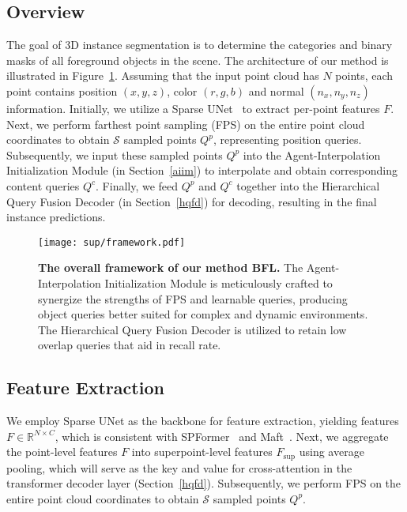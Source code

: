 \subsection{Overview}
\label{overview}
The goal of 3D instance segmentation is to determine the categories and binary masks of all foreground objects in the scene. 
%
The architecture of our method is illustrated in Figure~\ref{framework}.
%
Assuming that the input point cloud
has $N$ points, each point contains position $(x, y, z)$, color
$(r, g, b)$ and normal $(n_x, n_y, n_z)$ information.
Initially, we utilize a Sparse UNet~\cite{spconv2022} to extract per-point features $F$. Next, we perform farthest point sampling (FPS) on the entire point cloud coordinates to obtain $\mathcal{S}$ sampled points $Q^p$, representing position queries. Subsequently, we input these sampled points $Q^p$ into the Agent-Interpolation Initialization Module (in Section~\ref{aiim}) to interpolate and obtain corresponding content queries $Q^c$. Finally, we feed $Q^p$ and $Q^c$ together into the Hierarchical Query Fusion Decoder (in Section~\ref{hqfd}) for decoding, resulting in the final instance predictions.


\begin{figure}[!t]
    \vspace{-2em}
    \begin{center}
        \texttt{[image: sup/framework.pdf]}
        \caption{\textbf{The overall framework of our method BFL.} The Agent-Interpolation Initialization Module is meticulously crafted to synergize the strengths of FPS and learnable queries, producing object queries better suited for complex and dynamic environments. The Hierarchical Query Fusion Decoder is utilized to retain low overlap queries that aid in recall rate.\vspace{-1.0em}
        }
        \label{framework}
    \end{center}
    \vspace{-1.em}
\end{figure}
\subsection{Feature Extraction}
We employ Sparse UNet as the backbone for feature extraction, yielding features $F \in \mathbb{R} ^{N\times C}$, which is consistent with SPFormer~\cite{sun2023superpoint} and Maft~\cite{lai2023mask}. Next, we aggregate the point-level features $F$ into superpoint-level features $F_{\text{sup}}$ using average pooling, which will serve as the key and value for cross-attention in the transformer decoder layer (Section~\ref{hqfd}). Subsequently, we perform FPS on the entire point cloud coordinates to obtain $\mathcal{S}  $ sampled points $Q^p$.
